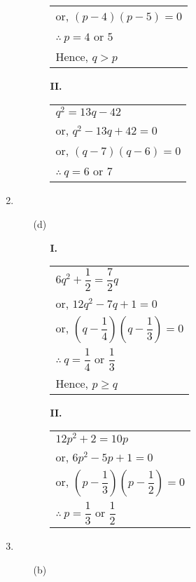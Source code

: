 \begin{multicols}{2}
\begin{enumerate}
\begin{itemize}
\begin{multicols}{2}
\begin{itemize}
\begin{tabular}[t]{l}
          or, $(p - 4)(p - 5) = 0$\\
          $\therefore~ p = 4$ or $5$\\
          Hence, $q > p$
        \end{tabular}
      \item[{\bf II.}]
        \begin{tabular}[t]{l}
          $q^2 = 13q - 42$\\
          or, $q^2 - 13q + 42 = 0$\\
          or, $(q - 7)(q - 6) = 0$\\
          $\therefore~ q = 6$ or $7$
          \end{tabular}
       \end{itemize}
     \end{multicols}
  \end{itemize}
\item
  \begin{itemize}
  \item[(d)]
        \begin{multicols}{2}
      \begin{itemize}
      \item[{\bf I.}]
        \begin{tabular}[t]{l}
          $6q^2 + \dfrac{1}{2} = \dfrac{7}{2}q$\\
          or, $12q^2 - 7q + 1 = 0$\\
          or, $\left(q - \dfrac{1}{4} \right) \left(q - \dfrac{1}{3} \right) = 0$\\
          $\therefore~ q = \dfrac{1}{4}$ or $\dfrac{1}{3}$\\
          Hence, $p \geq q$
        \end{tabular}
      \item[{\bf II.}]
        \begin{tabular}[t]{l}
          $12p^2 + 2 = 10p$\\
          or, $6p^2 - 5p + 1 = 0$\\
          or, $\left(p - \dfrac{1}{3}\right) \left(p - \dfrac{1}{2}\right) = 0$\\
          $\therefore~ p = \dfrac{1}{3}$ or $\dfrac{1}{2}$
          \end{tabular}
       \end{itemize}
     \end{multicols}
  \end{itemize}
\item
  \begin{itemize}
  \item[(b)]

\end{itemize}
\end{enumerate}
\end{multicols}
